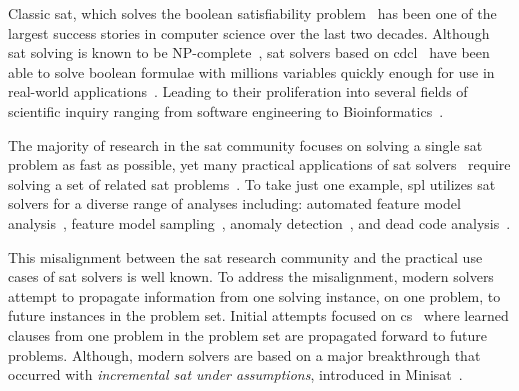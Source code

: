 \label{section:motivation}
%
%
Classic \ac{sat}, which solves the boolean satisfiability problem~\cite{BBH+09}
has been one of the largest success stories in computer science over the last
two decades. Although \ac{sat} solving is known to be
NP-complete~\cite{10.1145/800157.805047}, \ac{sat} solvers based on
\ac{cdcl}~\cite{Marques-Silva:1999:GSA:304491.304506,Silva:1997:GNS:244522.244560,10.5555/1867406.1867438}
have been able to solve boolean formulae with millions variables quickly enough
for use in real-world applications~\cite{10.5555/1557461}. Leading to their
proliferation into several fields of scientific inquiry ranging from software
engineering to
Bioinformatics~\cite{10.1007/11814948_16,10.1007/978-3-642-31612-8_12}.

The majority of research in the \ac{sat} community focuses on solving a single
\ac{sat} problem as fast as possible, yet many practical applications of
\ac{sat}
solvers~\cite{silva1997robust,10.1007/3-540-44798-9_4,10.1145/378239.379019,10.1145/1698759.1698762,Een_asingle-instance,een2003temporal,10.5555/1998496.1998520}
require solving a set of related \ac{sat}
problems~\cite{10.1007/3-540-44798-9_4, silva1997robust, een2003temporal}. To
take just one example, \ac{spl} utilizes \ac{sat} solvers for a diverse range of
analyses including: automated feature model
analysis~\cite{useBTRC05,GBT+19,TAK+:CSUR14}, feature model
sampling~\cite{MKR+:ICSE16,VAT+:SPLC18}, anomaly
detection~\cite{AKTS:FOSD16,KAT:TR16,MNS+:SPLC17}, and dead code
analysis~\cite{TLSS:EuroSys11}.

This misalignment between the \ac{sat} research community and the practical use
cases of \ac{sat} solvers is well known. To address the misalignment, modern
solvers attempt to propagate information from one solving instance, on one
problem, to future instances in the problem set. Initial attempts focused on
\ac{cs}~\cite{10.1007/3-540-44798-9_4,10.1145/378239.379019} where learned
clauses from one problem in the problem set are propagated forward to future
problems. Although, modern solvers are based on a major breakthrough that
occurred with \emph{incremental \ac{sat} under assumptions}, introduced in
Minisat~\cite{10.1007/978-3-540-24605-3_37}.

